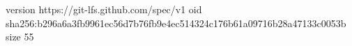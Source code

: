 version https://git-lfs.github.com/spec/v1
oid sha256:b296a6a3fb9961ec56d7b76fb9e4ec514324c176b61a09716b28a47133c0053b
size 55
